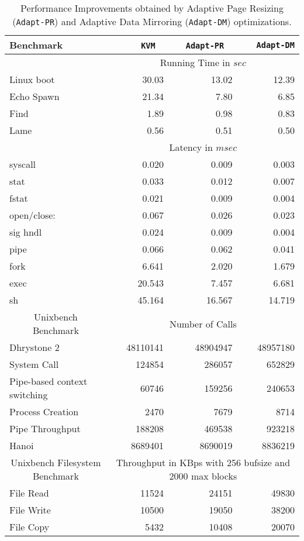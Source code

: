 \begin{table*}
\centering
      \begin{tabular}{|l| r r r |} \hline
        Benchmark\verb, ,& {\tt KVM} \verb, , & {\tt Adapt-PR} \verb, , & {\tt Adapt-DM}  \\ \hline
     & \multicolumn{3}{c|}{ Running Time in $sec$}\\ \cline {2-4}  
Linux boot	&	30.03	&	13.02	&	12.39	\\
Echo Spawn	&	21.34	&	7.80	&	6.85	\\
Find	&	1.89	&	0.98	&	0.83	\\
Lame	&	0.56	&	0.51	&	0.50	\\
\cline{2-4}
	   
     & \multicolumn{3}{c|}{Latency in $msec$}\\  \cline{2-4}
syscall	&	0.020	&	0.009	&	0.003	\\
stat	&	0.033	&	0.012	&	0.007	\\
fstat	&	0.021	&	0.009	&	0.004	\\
open/close:	&	0.067	&	0.026	&	0.023	\\
sig hndl	&	0.024	&	0.009	&	0.004	\\
pipe 	&	0.066	&	0.062	&	0.041	\\
fork	&	6.641	&	2.020	&	1.679	\\
exec	&	20.543	&	7.457	&	6.681	\\
sh	&	45.164	&	16.567	&	14.719	\\
 \hline
\cline{1-4}
\multicolumn{1}{|c|}{Unixbench Benchmark}     & \multicolumn{3}{c|}{Number of Calls}\\  \cline{1-4}
Dhrystone 2	&	48110141	&	48904947	&	48957180\\
System Call	&	124854	&	286057	&	652829\\
Pipe-based context switching	&	60746	&	159256	&	240653\\
Process Creation	&	2470	&	7679	&	8714\\
Pipe Throughput	&	188208	&	469538	&	923218\\
Hanoi	&	8689401	&	8690019	&	8836219\\
\cline{1-4}
\multicolumn{1}{|c|}{Unixbench Filesystem Benchmark}     & \multicolumn{3}{c|}{Throughput in KBps with 256 bufsize and 2000 max blocks
}\\  \cline{1-4}
File Read	&	11524	&	24151	&	49830\\
File Write	&	10500	&	19050	&	38200\\
File Copy	&	5432	&	10408	&	20070\\	\cline{1-4}

      \end{tabular}
\caption{\label{tab:detailed_results}Performance Improvements obtained by Adaptive Page Resizing ({\tt Adapt-PR}) and Adaptive Data Mirroring ({\tt Adapt-DM}) optimizations.}
\end{table*} 

